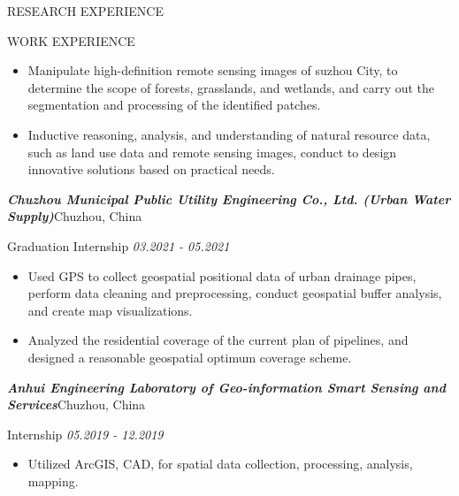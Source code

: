 \documentclass{resume}
\begin{document}
\begin{ResumeSection}{RESEARCH EXPERIENCE}
\begin{ResumeSection}{WORK EXPERIENCE}
\begin{itemize}
        \item Manipulate high-definition remote sensing images of suzhou City, to determine the scope of forests, grasslands, and wetlands, and carry out the segmentation and processing of the identified patches.

    \end{itemize}

    \begin{itemize}
    
        \item Inductive reasoning, analysis, and understanding of natural resource data, such as land use data and remote sensing images, conduct to design innovative solutions based on practical needs.

    \end{itemize}




\textbf{\textit{Chuzhou Municipal Public Utility Engineering Co., Ltd. (Urban Water Supply)}}\hfill{{Chuzhou, China}}

{Graduation Internship}
\hfill{  \textit{03.2021 - 05.2021}} 
    \begin{itemize}
    
        \item Used GPS to collect geospatial positional data of urban drainage pipes, perform data cleaning and preprocessing, conduct geospatial buffer analysis, and create map visualizations.

    \end{itemize}

    \begin{itemize}
    
        \item Analyzed the residential coverage of the current plan of pipelines, and designed a reasonable geospatial optimum coverage scheme.

    \end{itemize}


\textbf{\textit{Anhui Engineering Laboratory of Geo-information Smart Sensing and Services}}\hfill{{Chuzhou, China}}

{Internship}
\hfill{\textit{05.2019 - 12.2019}} 
    \begin{itemize}
    
        \item Utilized ArcGIS, CAD, for spatial data collection, processing, analysis, mapping.

    \end{itemize}


\end{ResumeSection}
\end{ResumeSection}
\end{document}
